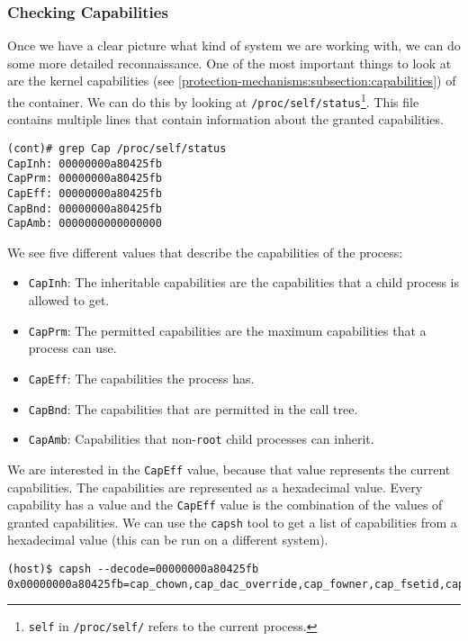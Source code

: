 \subsubsection{Checking Capabilities}\label{subsubsection:container:capabilities}
Once we have a clear picture what kind of system we are working with, we can do some more detailed reconnaissance. One of the most important things to look at are the kernel capabilities (see \autoref{protection-mechanisms:subsection:capabilities}) of the container. We can do this by looking at \lstinline{/proc/self/status}\footnote{\lstinline{self} in \lstinline{/proc/self/} refers to the current process.}. This file contains multiple lines that contain information about the granted capabilities.

\begin{lstlisting}[caption={Capabilities of process in container.},captionpos=b]
(cont)# grep Cap /proc/self/status
CapInh:	00000000a80425fb
CapPrm:	00000000a80425fb
CapEff:	00000000a80425fb
CapBnd:	00000000a80425fb
CapAmb:	0000000000000000
\end{lstlisting}

We see five different values that describe the capabilities of the process:
\begin{itemize}
    \item \lstinline{CapInh}: The inheritable capabilities are the capabilities that a child process is allowed to get.
    \item \lstinline{CapPrm}: The permitted capabilities are the maximum capabilities that a process can use.
    \item \lstinline{CapEff}: The capabilities the process has.
    \item \lstinline{CapBnd}: The capabilities that are permitted in the call tree.
    \item \lstinline{CapAmb}: Capabilities that non-\lstinline{root} child processes can inherit.
\end{itemize}

We are interested in the \lstinline{CapEff} value, because that value represents the current capabilities. The capabilities are represented as a hexadecimal value. Every capability has a value and the \lstinline{CapEff} value is the combination of the values of granted capabilities. We can use the \lstinline{capsh} tool to get a list of capabilities from a hexadecimal value (this can be run on a different system).

\begin{lstlisting}[caption={\lstinline{capsh} shows capabilities.},captionpos=b]
(host)$ capsh --decode=00000000a80425fb
0x00000000a80425fb=cap_chown,cap_dac_override,cap_fowner,cap_fsetid,cap_kill,cap_setgid,cap_setuid,cap_setpcap,cap_net_bind_service,cap_net_raw,cap_sys_chroot,cap_mknod,cap_audit_write,cap_setfcap
\end{lstlisting}

